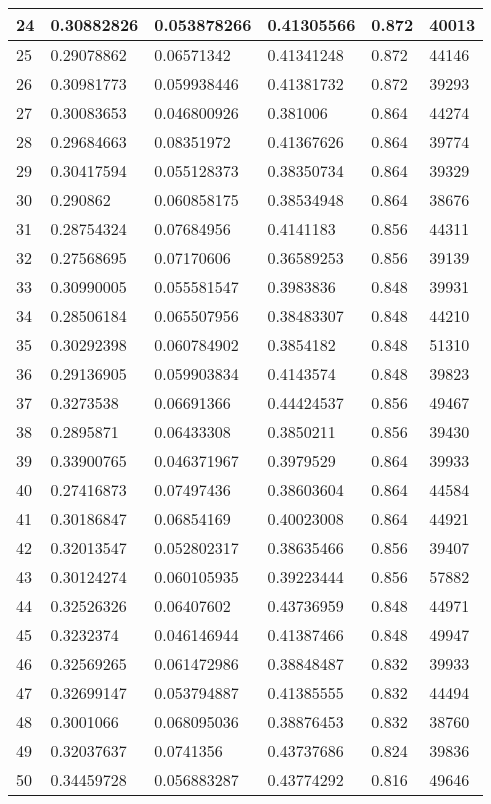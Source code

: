 \begin{longtable}{|l|l|l|l|l|l|}
24 & 0.30882826 & 0.053878266 & 0.41305566 & 0.872 & 40013 \\ \hline 
25 & 0.29078862 & 0.06571342 & 0.41341248 & 0.872 & 44146 \\ \hline 
26 & 0.30981773 & 0.059938446 & 0.41381732 & 0.872 & 39293 \\ \hline 
27 & 0.30083653 & 0.046800926 & 0.381006 & 0.864 & 44274 \\ \hline 
28 & 0.29684663 & 0.08351972 & 0.41367626 & 0.864 & 39774 \\ \hline 
29 & 0.30417594 & 0.055128373 & 0.38350734 & 0.864 & 39329 \\ \hline 
30 & 0.290862 & 0.060858175 & 0.38534948 & 0.864 & 38676 \\ \hline 
31 & 0.28754324 & 0.07684956 & 0.4141183 & 0.856 & 44311 \\ \hline 
32 & 0.27568695 & 0.07170606 & 0.36589253 & 0.856 & 39139 \\ \hline 
33 & 0.30990005 & 0.055581547 & 0.3983836 & 0.848 & 39931 \\ \hline 
34 & 0.28506184 & 0.065507956 & 0.38483307 & 0.848 & 44210 \\ \hline 
35 & 0.30292398 & 0.060784902 & 0.3854182 & 0.848 & 51310 \\ \hline 
36 & 0.29136905 & 0.059903834 & 0.4143574 & 0.848 & 39823 \\ \hline 
37 & 0.3273538 & 0.06691366 & 0.44424537 & 0.856 & 49467 \\ \hline 
38 & 0.2895871 & 0.06433308 & 0.3850211 & 0.856 & 39430 \\ \hline 
39 & 0.33900765 & 0.046371967 & 0.3979529 & 0.864 & 39933 \\ \hline 
40 & 0.27416873 & 0.07497436 & 0.38603604 & 0.864 & 44584 \\ \hline 
41 & 0.30186847 & 0.06854169 & 0.40023008 & 0.864 & 44921 \\ \hline 
42 & 0.32013547 & 0.052802317 & 0.38635466 & 0.856 & 39407 \\ \hline 
43 & 0.30124274 & 0.060105935 & 0.39223444 & 0.856 & 57882 \\ \hline 
44 & 0.32526326 & 0.06407602 & 0.43736959 & 0.848 & 44971 \\ \hline 
45 & 0.3232374 & 0.046146944 & 0.41387466 & 0.848 & 49947 \\ \hline 
46 & 0.32569265 & 0.061472986 & 0.38848487 & 0.832 & 39933 \\ \hline 
47 & 0.32699147 & 0.053794887 & 0.41385555 & 0.832 & 44494 \\ \hline 
48 & 0.3001066 & 0.068095036 & 0.38876453 & 0.832 & 38760 \\ \hline 
49 & 0.32037637 & 0.0741356 & 0.43737686 & 0.824 & 39836 \\ \hline 
50 & 0.34459728 & 0.056883287 & 0.43774292 & 0.816 & 49646 \\ \hline 
\end{longtable}